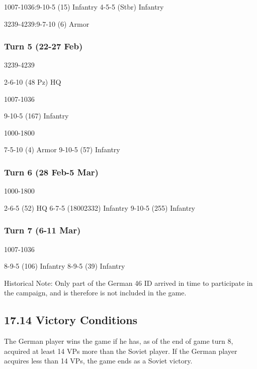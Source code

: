 \documentclass[10pt]{article}
\begin{document}
1007-1036:9-10-5 (15) Infantry
4-5-5 (Stbr) Infantry

3239-4239:9-7-10 (6) Armor

\subsubsection*{Turn 5 (22-27 Feb)}

3239-4239

2-6-10 (48 Pz)     HQ

1007-1036

9-10-5 (167) Infantry

1000-1800

7-5-10 (4) Armor
9-10-5 (57) Infantry

\subsubsection*{Turn 6 (28 Feb-5 Mar)}

1000-1800

2-6-5 (52) HQ
6-7-5 (18002332) Infantry
9-10-5 (255) Infantry

\subsubsection*{Turn 7 (6-11 Mar)}

1007-1036

8-9-5 (106) Infantry
8-9-5 (39) Infantry

Historical Note: Only part of the German 46 ID arrived in time to
participate in the campaign, and is therefore is not included in the game.

\subsection*{17.14 Victory Conditions}

The German player wins the game if he has, as of the end of game turn 8,
acquired at least 14 VPs more than the Soviet player. If the German player
acquires less than 14 VPs, the game ends as a Soviet victory.
\end{document}
